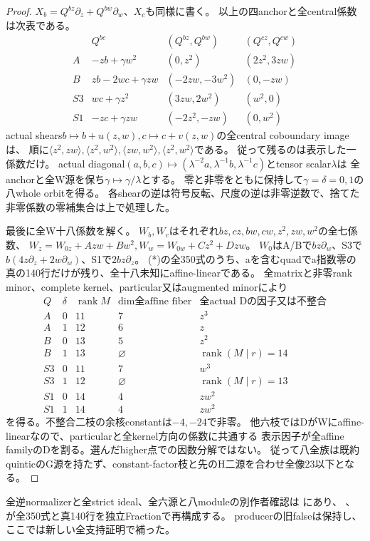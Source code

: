 \documentclass[a4paper,11pt]{ltjsarticle}
\theoremstyle{definition}
\newcommand{\rank}{\operatorname{rank}}
\begin{document}
\begin{proof}
$X_b=Q^{bz}\partial_z+Q^{bw}\partial_w$、$X_c$も同様に書く。
以上の四anchorと全central係数は次表である。
\[
\begin{array}{c|c|c|c}
 &Q^{bc}&(Q^{bz},Q^{bw})&(Q^{cz},Q^{cw})\\\hline
 A&-zb+\gamma w^2&(0,z^2)&(2z^2,3zw)\\
 B&zb-2wc+\gamma zw&(-2zw,-3w^2)&(0,-zw)\\
 S3&wc+\gamma z^2&(3zw,2w^2)&(w^2,0)\\
 S1&-zc+\gamma zw&(-2z^2,-zw)&(0,w^2)
\end{array}
\]
actual shears$b\mapsto b+u(z,w),c\mapsto c+v(z,w)$の全central coboundary imageは、
順に$\langle z^2,zw\rangle,\langle z^2,w^2\rangle,
\langle zw,w^2\rangle,\langle z^2,w^2\rangle$である。
従って残るのは表示した一係数だけ。
actual diagonal$(a,b,c)\mapsto(\lambda^{-2}a,\lambda^{-1}b,\lambda^{-1}c)$とtensor scalar$\lambda$は
全anchorと全W源を保ち$\gamma\mapsto\gamma/\lambda$とする。
零と非零をともに保持して$\gamma=\delta=0,1$の八whole orbitを得る。
各shearの逆は符号反転、尺度の逆は非零逆数で、捨てた非零係数の零補集合は上で処理した。

最後に全W十八係数を解く。
$W_b,W_c$はそれぞれ$bz,cz,bw,cw,z^2,zw,w^2$の全七係数、
$W_z=W_{0z}+Azw+Bw^2,W_w=W_{0w}+Cz^2+Dzw$。
$W_0$はA/Bで$bz\partial_w$、S3で$b(4z\partial_z+2w\partial_w)$、S1で$2bz\partial_z$。
(*)の全350式のうち、aを含むquadでa指数零の真の140行だけが残り、全十八未知にaffine-linearである。
全matrixと非零rank minor、complete kernel、particular又はaugmented minorにより
\[
\begin{array}{c|c|c|c|c}
 Q&\delta&\rank M&\dim\text{全affine fiber}&\text{全actual Dの因子又は不整合}\\\hline
 A&0&11&7&z^3\\ A&1&12&6&z\\
 B&0&13&5&z^2\\ B&1&13&\varnothing&\rank(M\mid r)=14\\
 S3&0&11&7&w^3\\ S3&1&12&\varnothing&\rank(M\mid r)=13\\
 S1&0&14&4&zw^2\\ S1&1&14&4&zw^2
\end{array}
\]
を得る。不整合二枝の余核constantは$-4,-24$で非零。
他六枝ではDがWにaffine-linearなので、particularと全kernel方向の係数に共通する
表示因子が全affine familyのDを割る。選んだhigher点での因数分解ではない。
従って八全族は既約quinticのG源を持たず、constant-factor枝と先のH二源を合わせ全像23以下となる。
\end{proof}
全逆normalizerと全strict ideal、全六源と八moduleの別作者確認は
にあり、
、
が全350式と真140行を独立Fractionで再構成する。
producerの旧falseは保持し、ここでは新しい全支持証明で補った。
\end{document}

